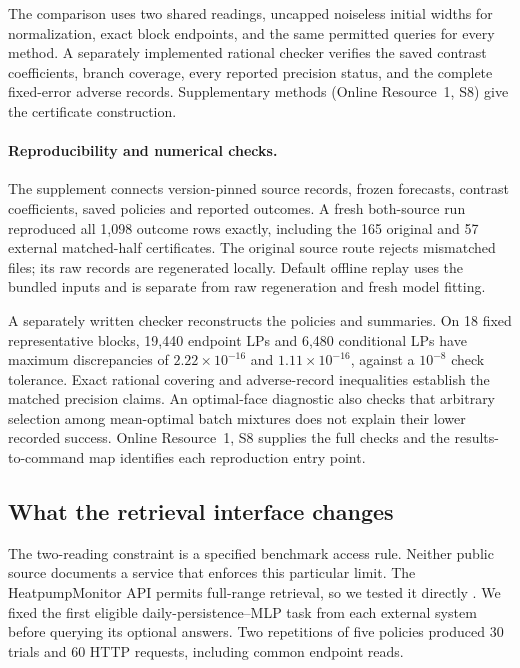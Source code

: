 \documentclass[12pt]{article}
\begin{document}
The comparison uses two shared readings, uncapped noiseless initial widths for
normalization, exact block endpoints, and the same permitted queries for
every method.  A separately implemented rational checker verifies the
saved contrast coefficients, branch coverage, every reported precision
status, and the complete fixed-error adverse records.  Supplementary
methods (Online Resource~1, S8) give the certificate construction.
\paragraph{Reproducibility and numerical checks.}
The supplement connects version-pinned source records, frozen forecasts,
contrast coefficients, saved policies and reported outcomes. A fresh
both-source run reproduced all 1,098 outcome rows exactly, including the
165 original and 57 external matched-half certificates. The original
source route rejects mismatched files; its raw records are regenerated
locally. Default offline replay uses the bundled inputs and is separate
from raw regeneration and fresh model fitting.

A separately written checker reconstructs the policies and summaries. On
18 fixed representative blocks, 19,440 endpoint LPs and 6,480 conditional
LPs have maximum discrepancies of $2.22\times10^{-16}$ and
$1.11\times10^{-16}$, against a $10^{-8}$ check tolerance. Exact rational
covering and adverse-record inequalities establish the matched precision
claims. An optimal-face diagnostic also checks that arbitrary selection
among mean-optimal batch mixtures does not explain their lower recorded
success. Online Resource~1, S8 supplies the full checks and the
results-to-command map identifies each reproduction entry point.
\subsection{What the retrieval interface changes}
\label{sec:actual-api}
The two-reading constraint is a specified benchmark access rule. Neither
public source documents a service that enforces this particular limit.
The HeatpumpMonitor API permits full-range retrieval, so we tested it
directly \citep{hpmapi,hpmcode}. We fixed the first eligible
daily-persistence--MLP task from each external system before querying its
optional answers. Two repetitions of five policies produced 30 trials
and 60 HTTP requests, including common endpoint reads.
\end{document}
